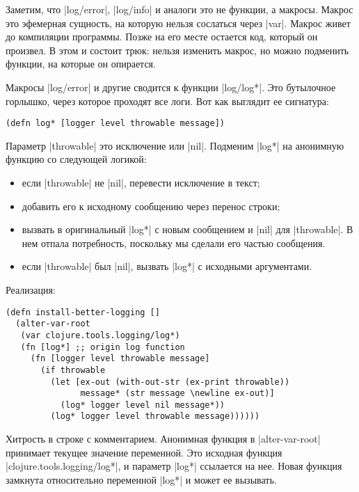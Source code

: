 Заметим, что \spverb|log/error|, \spverb|log/info| и аналоги это не функции, а
макросы. Макрос это эфемерная сущность, на которую нельзя сослаться через
\spverb|var|. Макрос живет до компиляции программы. Позже на его месте остается
код, который он произвел. В этом и состоит трюк: нельзя изменить макрос, но
можно подменить функции, на которые он опирается.

Макросы \spverb|log/error| и другие сводится к функции \spverb|log/log*|. Это
бутылочное горлышко, через которое проходят все логи. Вот как выглядит ее
сигнатура:

\begin{verbatim}
(defn log* [logger level throwable message])
\end{verbatim}

Параметр \spverb|throwable| это исключение или \spverb|nil|. Подменим
\spverb|log*| на анонимную функцию со следующей логикой:

\begin{itemize}

\item
  если \spverb|throwable| не \spverb|nil|, перевести исключение в текст;

\item
  добавить его к исходному сообщению через перенос строки;

\item
  вызвать в оригинальный \spverb|log*| с новым сообщением и \spverb|nil| для
  \spverb|throwable|. В нем отпала потребность, поскольку мы сделали его частью
  сообщения.

\item
  если \spverb|throwable| был \spverb|nil|, вызвать \spverb|log*| с исходными
  аргументами.

\end{itemize}

\noindent
Реализация:

\begin{verbatim}
(defn install-better-logging []
  (alter-var-root
   (var clojure.tools.logging/log*)
   (fn [log*] ;; origin log function
     (fn [logger level throwable message]
       (if throwable
         (let [ex-out (with-out-str (ex-print throwable))
               message* (str message \newline ex-out)]
           (log* logger level nil message*))
         (log* logger level throwable message))))))
\end{verbatim}

Хитрость в строке с комментарием. Анонимная функция в \spverb|alter-var-root|
принимает текущее значение переменной. Это исходная функция
\spverb|clojure.tools.logging/log*|, и параметр \spverb|log*| ссылается на
нее. Новая функция замкнута относительно переменной \spverb|log*| и может ее
вызывать.

